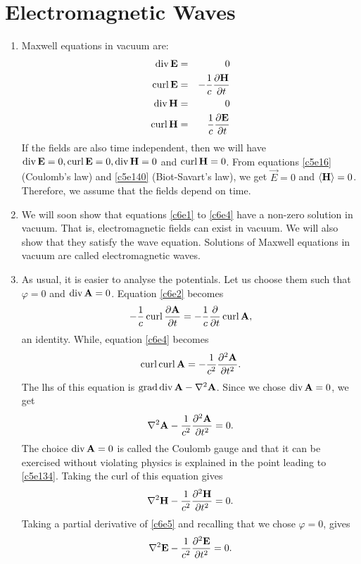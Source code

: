 \chapter{Electromagnetic Waves}\label{c6}
\begin{enumerate}
\item Maxwell equations in vacuum are:
\begin{eqnarray}
\operatorname{div}\mathbf{E} &=& 0 \label{c6e1} \\
\operatorname{curl}\mathbf{E} &=& -\frac{1}{c}\frac{\partial{\mathbf{H}}}{\partial{t}} \label{c6e2} \\
\operatorname{div}\mathbf{H} &=& 0 \label{c6e3} \\
\operatorname{curl}\mathbf{H} &=& \frac{1}{c}\frac{\partial{\mathbf{E}}}{\partial{t}} \label{c6e4}
\end{eqnarray}
If the fields are also time independent, then we will have $\operatorname{div}\mathbf{E} = 0,
\operatorname{curl}\mathbf{E} = 0, \operatorname{div}\mathbf{H} = 0$ and $\operatorname{curl}\mathbf{H} = 0$. From equations
\eqref{c5e16} (Coulomb's law) and \eqref{c5e140} (Biot-Savart's law), we get
$\vec{E} = 0$ and $\left\langle{\mathbf{H}}\right\rangle = 0$. Therefore, we assume that the fields depend
on time.

\item We will soon show that equations \eqref{c6e1} to \eqref{c6e4} have a
non-zero solution in vacuum. That is, electromagnetic fields can exist in vacuum.
We will also show that they satisfy the wave equation. Solutions of Maxwell
equations in vacuum are called electromagnetic waves.

\item As usual, it is easier to analyse the potentials. Let us choose them such
that $\varphi = 0$ and $\operatorname{div}\mathbf{A} = 0$. Equation \eqref{c6e2} becomes
\[
-\frac{1}{c}\operatorname{curl}\frac{\partial{\mathbf{A}}}{\partial{t}} = 
-\frac{1}{c}\frac{\partial}{\partial t}\operatorname{curl}\mathbf{A},
\]
an identity. While, equation \eqref{c6e4} becomes
\[
\operatorname{curl}\operatorname{curl}\mathbf{A} = -\frac{1}{c^2}\frac{\partial^2{\mathbf{A}}}{\partial{t}^2}.
\]
The lhs of this equation is $\operatorname{grad}\operatorname{div}\mathbf{A} - \nabla^2\mathbf{A}$. Since we chose
$\operatorname{div}{\mathbf{A}} = 0$, we get
\begin{equation}\label{c6e5}
\nabla^2\mathbf{A} - \frac{1}{c^2}\frac{\partial^2{\mathbf{A}}}{\partial{t}^2} = 0.
\end{equation}
The choice $\operatorname{div}{\mathbf{A}} = 0$ is called the Coulomb gauge and that it can be
exercised without violating physics is explained in the point leading to 
\eqref{c5e134}. Taking the curl of this equation gives
\begin{equation}\label{c6e6}
\nabla^2\mathbf{H} - \frac{1}{c^2}\frac{\partial^2{\mathbf{H}}}{\partial{t}^2} = 0.
\end{equation}
Taking a partial derivative of \eqref{c6e5} and recalling that we chose $\varphi
= 0$, gives
\begin{equation}\label{c6e7}
\nabla^2\mathbf{E} - \frac{1}{c^2}\frac{\partial^2{\mathbf{E}}}{\partial{t}^2} = 0.
\end{equation}

\end{enumerate}